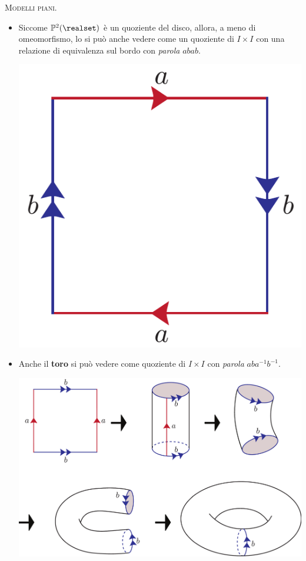 \begin{examples} \textsc{Modelli piani.}\\
			\begin{itemize}
		\item Siccome $\mathbb{P}^2(\realset)$ è un quoziente del disco, allora, a meno di omeomorfismo, lo si può anche vedere come un quoziente di $I\times I$ con una relazione di equivalenza sul bordo con \textit{parola} $abab$.
		\begin{center}
		\includegraphics[trim=0cm 0cm 0cm 0cm, clip, scale=0.375]{images/proj.pdf}
		\end{center}
		\item Anche il \textbf{toro} si può vedere come quoziente di $I\times I$ con \textit{parola} $aba^{-1}b^{-1}$.
		\begin{center}
			\includegraphics[trim=0cm 0cm 0cm 0cm, clip, scale=0.375]{images/torus.pdf}

\end{center}
\end{itemize}
\end{examples}
